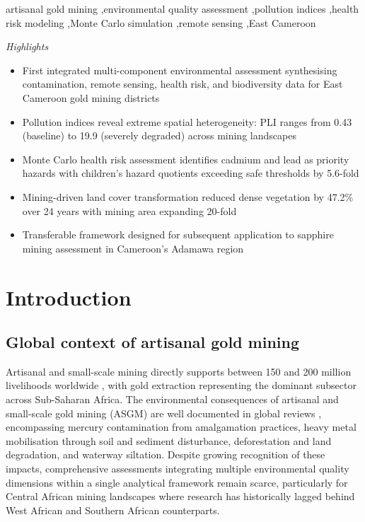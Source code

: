 \documentclass[preprint,12pt,number]{elsarticle}
\begin{document}
\begin{frontmatter}
\begin{abstract}
\end{abstract}

\begin{keyword}
artisanal gold mining \sep environmental quality assessment \sep pollution indices \sep health risk modeling \sep Monte Carlo simulation \sep remote sensing \sep East Cameroon
\end{keyword}

\end{frontmatter}

\begin{center}
\textit{Highlights}
\end{center}

\begin{itemize}
\item First integrated multi-component environmental assessment synthesising contamination, remote sensing, health risk, and biodiversity data for East Cameroon gold mining districts
\item Pollution indices reveal extreme spatial heterogeneity: PLI ranges from 0.43 (baseline) to 19.9 (severely degraded) across mining landscapes
\item Monte Carlo health risk assessment identifies cadmium and lead as priority hazards with children's hazard quotients exceeding safe thresholds by 5.6-fold
\item Mining-driven land cover transformation reduced dense vegetation by 47.2\% over 24 years with mining area expanding 20-fold
\item Transferable framework designed for subsequent application to sapphire mining assessment in Cameroon's Adamawa region
\end{itemize}


\section{Introduction}

\subsection{Global context of artisanal gold mining}

Artisanal and small-scale mining directly supports between 150 and 200 million livelihoods worldwide \cite{WorldBank2019}, with gold extraction representing the dominant subsector across Sub-Saharan Africa. The environmental consequences of artisanal and small-scale gold mining (ASGM) are well documented in global reviews \cite{Spiegel2005, Obrist2018, Esdaile2018}, encompassing mercury contamination from amalgamation practices, heavy metal mobilisation through soil and sediment disturbance, deforestation and land degradation, and waterway siltation. Despite growing recognition of these impacts, comprehensive assessments integrating multiple environmental quality dimensions within a single analytical framework remain scarce, particularly for Central African mining landscapes where research has historically lagged behind West African and Southern African counterparts.
\end{document}
